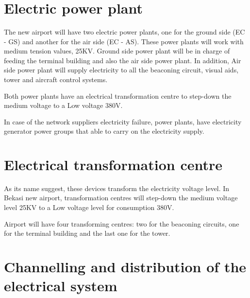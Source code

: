 	\section{Electric power plant}
	\paragraph{} The new airport will have two electric power plants, one for the ground side (EC - GS) and another for the air side (EC - AS). These power plants will work with medium tension values, 25KV. Ground side power plant will be in charge of feeding the terminal building and also the air side power plant. In addition, Air side power plant will supply electricity to all the beaconing circuit, visual aids, tower and aircraft control systems.
	
	Both power plants have an electrical transformation centre to step-down the medium voltage to a Low voltage 380V.
	
	In case of the network suppliers electricity failure, power plants, have electricity generator power groups that able to carry on the electricity supply.
	 	
	
	\section{Electrical transformation centre}
	\paragraph{} As its name suggest, these devices transform the electricity voltage level. In Bekasi new airport, transformation centres will step-down the medium voltage level 25KV to a Low voltage level for consumption 380V.
	
	Airport will have four transforming centres: two for the beaconing circuits, one for the terminal building and the last one for the tower.
	
	
	\section{Channelling and distribution of the electrical system}
	
	